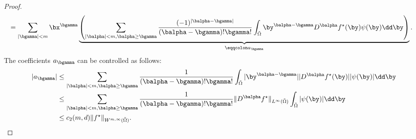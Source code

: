 \documentclass[11pt]{article}
\begin{document}
\begin{proof}
\begin{equation*}
\begin{aligned}
            &= \sum_{|{\bgamma}| < m} \bx^{\bgamma} \underbrace{\left( \sum_{|{\balpha}| < m, {\balpha} \geq {\bgamma}} \frac{(-1)^{|{\balpha} - {\bgamma}|}}{({\balpha} - {\bgamma})! {\bgamma}!} \int_{\tilde{\Omega}} \by^{{\balpha} - {\bgamma}} D^{\balpha} f^{\star}(\by) \psi(\by) \dd \by \right)}_{\eqqcolon a_{\bgamma}}.
        \end{aligned}
    \end{equation*}
    The coefficients $a_{\bgamma}$ can be controlled as follows:
    \begin{equation*}
        \begin{aligned}
            |a_{\bgamma}| &\leq \sum_{|{\balpha}| < m, {\balpha} \geq {\bgamma}} \frac{1}{({\balpha} - {\bgamma})! {\bgamma}!} \int_{\tilde{\Omega}} |\by^{{\balpha} - {\bgamma}}| |D^{\balpha} f^{\star}(\by)| |\psi(\by)| \dd \by \\
            &\leq \sum_{|{\balpha}| < m, {\balpha} \geq {\bgamma}} \frac{1}{({\balpha} - {\bgamma})! {\bgamma}!}  \|D^{\balpha} f^{\star}\|_{L^\infty(\tilde{\Omega})} \int_{\tilde{\Omega}} |\psi(\by)| \dd \by \\
            &\leq c_2{(m,d)} \|f^{\star}\|_{W^{m,\infty}(\tilde{\Omega})}.
        \end{aligned}
    \end{equation*}   

\end{proof}
\end{document}
